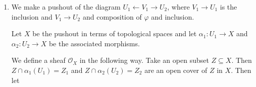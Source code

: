 \newcommand{\sheet}{5}




\maketitle{}

\begin{exercise}{1}
    \begin{enumerate}
        \item{We make a pushout of the diagram $U_1 \leftarrow V_1 \rightarrow
            U_2$, where $V_1 \rightarrow U_1$ is the inclusion and $V_1
            \rightarrow U_2$ and composition of $\varphi$ and inclusion.

            Let $X$ be the pushout in terms of topological spaces and let
            $\alpha_1 \colon U_1 \rightarrow X$ and $\alpha_2 \colon U_2
            \rightarrow X$ be the associated morphisms.

            We define a sheaf $\mathcal{O}_X$ in the following way. Take an open
            subset $Z \subseteq X$. Then $Z \cap \alpha_1(U_1) = Z_1$ and $Z
            \cap \alpha_2(U_2) = Z_2$ are an open cover of $Z$ in $X$. Then let}
    \end{enumerate}


\end{exercise}
